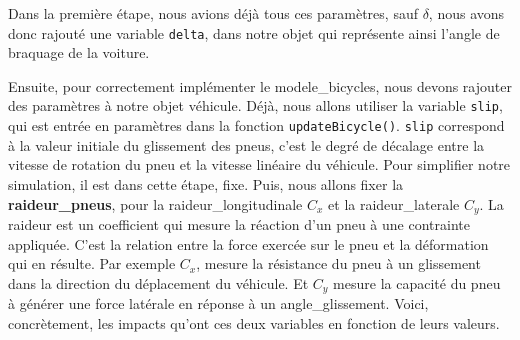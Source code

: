 Dans la première étape, nous avions déjà tous ces paramètres, sauf $\delta$, nous avons donc rajouté une variable \texttt{delta}, dans notre objet qui représente ainsi l'angle de braquage de la voiture.
%



Ensuite, pour correctement implémenter le \glspl{modele_bicycle}, nous devons rajouter des paramètres à notre objet véhicule.
Déjà, nous allons utiliser la variable \texttt{slip}, qui est entrée en paramètres dans la fonction \texttt{updateBicycle()}.
\texttt{slip} correspond à la valeur initiale du glissement des pneus, c'est le degré de décalage entre la vitesse de rotation du pneu et la vitesse linéaire du véhicule.
Pour simplifier notre simulation, il est dans cette étape, fixe.
Puis, nous allons fixer la \textbf{\gls{raideur_pneus}}, pour la \gls{raideur_longitudinale} $C_x$ et la \gls{raideur_laterale} $C_y$.
La raideur est un coefficient qui mesure la réaction d'un pneu à une contrainte appliquée.
C'est la relation entre la force exercée sur le pneu et la déformation qui en résulte.
Par exemple $C_x$, mesure la résistance du pneu à un glissement dans la direction du déplacement du véhicule.
Et $C_y$ mesure la capacité du pneu à générer une force latérale en réponse à un \gls{angle_glissement}.
Voici, concrètement, les impacts qu'ont ces deux variables en fonction de leurs valeurs.

